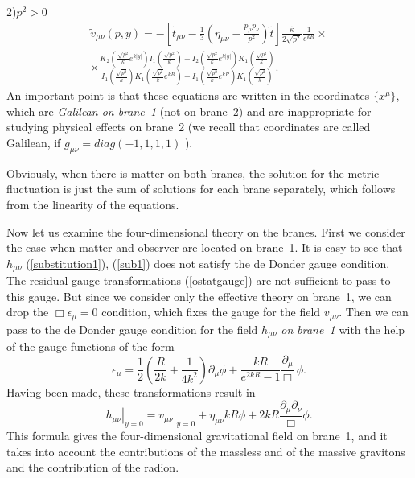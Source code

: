 \documentclass[a4paper,12pt]{article}
\begin{document}
2)$p^2>0$
\begin{eqnarray}
\tilde v_{\mu\nu}(p,y)=-\left[\tilde
t_{\mu\nu}-\frac{1}{3}\left(\eta_{\mu\nu}-\frac{p_{\mu}p_{\nu}}{p^2}\right)\tilde
t \right]\frac{\hat\kappa}{2\sqrt{p^2}}\frac{1}{e^{kR}}\times \\ \nonumber
\times \frac{K_2\left(\frac{\sqrt{p^2}}{k}e^{k|y|}\right)
I_1\left(\frac{\sqrt{p^2}}{k}\right)+I_2\left(\frac{\sqrt{p^2}}{k}e^{k|y|}\right)
K_1\left(\frac{\sqrt{p^2}}{k}\right)}{I_1\left(\frac{\sqrt{p^2}}{k}\right)
K_1\left(\frac{\sqrt{p^2}}{k}e^{kR}\right)-I_1\left(\frac{\sqrt{p^2}}{k}e^{kR}\right)
K_1\left(\frac{\sqrt{p^2}}{k}\right)}.
\end{eqnarray}
An important point is that these equations are written in the
coordinates $\{x^{\mu}\}$, which are {\it Galilean on brane~1}
(not on brane~2) and are inappropriate for studying physical
effects on brane~2 (we recall that coordinates are called Galilean,
if $g_{\mu \nu} = diag(-1, 1,1,1)$ \cite{LL}).

Obviously, when there is  matter on both branes, the solution for
the  metric fluctuation  is just the sum of solutions for each
brane separately, which follows from the  linearity of the
equations.

Now let us examine the four-dimensional theory on the branes. First we
consider the case when matter and observer are located on brane~1.
It is easy to see that $h_{\mu\nu}$ (\ref{substitution1}),
(\ref{sub1}) does not satisfy the de Donder gauge condition. The
residual gauge transformations (\ref{ostatgauge}) are not
sufficient to pass to this gauge. But since we consider only the
effective theory on brane~1, we can drop the
$\Box\epsilon_{\mu}=0$ condition, which fixes the gauge for the
field $v_{\mu\nu}$. Then we can pass to the  de Donder gauge
condition for the field  $h_{\mu\nu}$ {\it on brane~1} with the
help of the gauge functions of the form
\begin{equation}\label{gfunc}
\epsilon_{\mu}=\frac{1}{2}\left(\frac{R}{2k}+\frac{1}{4k^2}\right)\partial_{\mu}\phi+
\frac{kR}{e^{2kR}-1}\frac{\partial_{\mu}}{\Box} \ \phi.
\end{equation}
Having been made, these transformations result in
\begin{equation}\label{honbrane1}
\left. h_{\mu\nu}\right|_{y=0}=\left.
v_{\mu\nu}\right|_{y=0}+\eta_{\mu\nu}kR\phi+
2kR\frac{\partial_{\mu}\partial_{\nu}}{\Box}\phi.
\end{equation}
This formula gives the four-dimensional gravitational
field on brane~1, and it takes into account the  contributions of the massless and
of the massive gravitons and the contribution of the radion.
\end{document}
